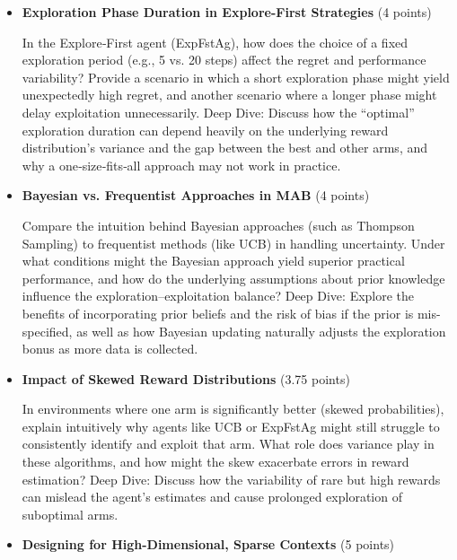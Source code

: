 \documentclass[12pt]{article}
\begin{document}
{{{\begin{itemize}[noitemsep]
    \vspace{0.25cm}
    The UCB algorithm adds a bonus term that decreases with the number of times an arm is pulled. Intuitively, why might a “conservative” (i.e., high) bonus slow down learning—even if it guarantees asymptotic optimality? Under what circumstances might a less conservative bonus be beneficial, and what risks does it carry?
    Deep Dive:
    Analyze how a high bonus may force the algorithm to continue sampling even when an arm’s estimated reward is clearly suboptimal, thereby delaying convergence. Conversely, discuss the risk of prematurely discarding an arm if the bonus is too low.
    \vspace{0.5cm}
    \item \textbf{Exploration Phase Duration in Explore-First Strategies} (4 points)
    
    \vspace{0.25cm}
    In the Explore‑First agent (ExpFstAg), how does the choice of a fixed exploration period (e.g., 5 vs. 20 steps) affect the regret and performance variability? Provide a scenario in which a short exploration phase might yield unexpectedly high regret, and another scenario where a longer phase might delay exploitation unnecessarily.
    Deep Dive:
    Discuss how the “optimal” exploration duration can depend heavily on the underlying reward distribution’s variance and the gap between the best and other arms, and why a one‑size‑fits‑all approach may not work in practice.
    \vspace{0.5cm}
    \item \textbf{Bayesian vs. Frequentist Approaches in MAB} (4 points)
    
    \vspace{0.25cm}
    Compare the intuition behind Bayesian approaches (such as Thompson Sampling) to frequentist methods (like UCB) in handling uncertainty. Under what conditions might the Bayesian approach yield superior practical performance, and how do the underlying assumptions about prior knowledge influence the exploration–exploitation balance?
    Deep Dive:
    Explore the benefits of incorporating prior beliefs and the risk of bias if the prior is mis-specified, as well as how Bayesian updating naturally adjusts the exploration bonus as more data is collected.
    \vspace{0.5cm}
    \item \textbf{Impact of Skewed Reward Distributions} (3.75 points)
    
    \vspace{0.25cm}
    In environments where one arm is significantly better (skewed probabilities), explain intuitively why agents like UCB or ExpFstAg might still struggle to consistently identify and exploit that arm. What role does variance play in these algorithms, and how might the skew exacerbate errors in reward estimation?
    Deep Dive:
    Discuss how the variability of rare but high rewards can mislead the agent’s estimates and cause prolonged exploration of suboptimal arms.
    \vspace{0.5cm}
    \item \textbf{Designing for High-Dimensional, Sparse Contexts} (5 points)
    

\end{itemize}}}}
\end{document}

